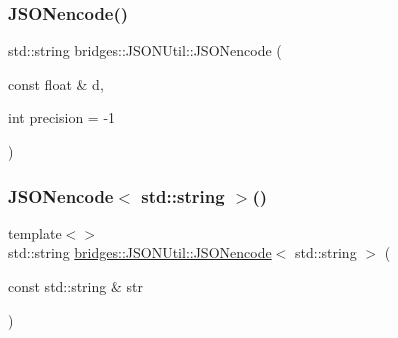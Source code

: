 \subsubsection{\texorpdfstring{JSONencode()}{JSONencode()}\hspace{0.1cm}{\footnotesize\ttfamily [4/4]}}
{\footnotesize\ttfamily std\+::string bridges\+::\+J\+S\+O\+N\+Util\+::\+J\+S\+O\+Nencode (\begin{DoxyParamCaption}\item[{const float \&}]{d,  }\item[{int}]{precision = {\ttfamily -\/1} }\end{DoxyParamCaption})\hspace{0.3cm}{\ttfamily [inline]}}

\mbox{\label{namespacebridges_1_1_j_s_o_n_util_a8db4f538e31bd8369e51a46802708f3d}} 
\subsubsection{\texorpdfstring{JSONencode$<$ std::string $>$()}{JSONencode< std::string >()}}
{\footnotesize\ttfamily template$<$$>$ \\
std\+::string \mbox{\hyperlink{namespacebridges_1_1_j_s_o_n_util_a8510af8bef5b7bf4062d6f25eceb20b4}{bridges\+::\+J\+S\+O\+N\+Util\+::\+J\+S\+O\+Nencode}}$<$ std\+::string $>$ (\begin{DoxyParamCaption}\item[{const std\+::string \&}]{str }\end{DoxyParamCaption})\hspace{0.3cm}{\ttfamily [inline]}}

